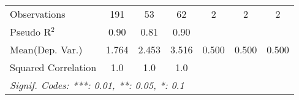 \begin{tabular}{lcccccc}
   Observations                                               & 191              & 53          & 62             & 2    & 2    & 2\\  
   Pseudo R$^2$                                               & 0.90             & 0.81        & 0.90           &      &      & \\  
Mean(Dep. Var.) & 1.764 & 2.453 & 3.516 & 0.500 & 0.500 & 0.500 \\
   Squared Correlation                                        & 1.0              & 1.0         & 1.0            &      &      & \\  
   \midrule \midrule
   \multicolumn{7}{l}{\emph{Signif. Codes: ***: 0.01, **: 0.05, *: 0.1}}\\
\end{tabular}
\par\endgroup
